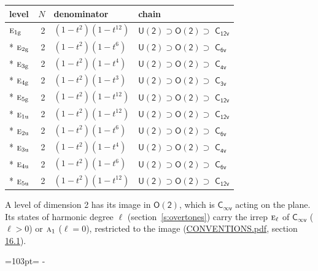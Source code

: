 \documentclass[10pt,a4paper]{article}
\newcommand{\needspace}[1]{\par\penalty-100\begingroup\dimen0=#1\relax\dimen2=\pagegoal
  \advance\dimen2-\pagetotal\ifdim\dimen0>\dimen2\relax\ifdim\dimen2>0pt\vfil\break\fi\fi
  \endgroup}
\numberwithin{equation}{section}
\newcommand{\grp}[1]{\mathsf{#1}}
\newcommand{\irr}[1]{\text{\normalfont\scshape #1}}
\newcommand{\ptag}[1]{\mathrm{#1}}
\begin{document}
{\small\begin{longtable}{@{}lrll@{}}\toprule
level & $N$ & denominator & chain\\\midrule\endhead
\bottomrule\endfoot\endlastfoot
$\irr{e}_{1\ptag{g}}$ & 2 & $(1-t^{2})(1-t^{12})$ & $\grp{U(2)} \supset \grp{O(2)} \supset$ \href{C12v.pdf}{$\grp{C_{12v}}$}\\*
$\irr{e}_{2\ptag{g}}$ & 2 & $(1-t^{2})(1-t^{6})$ & $\grp{U(2)} \supset \grp{O(2)} \supset$ \href{C6v.pdf}{$\grp{C_{6v}}$}\\*
$\irr{e}_{3\ptag{g}}$ & 2 & $(1-t^{2})(1-t^{4})$ & $\grp{U(2)} \supset \grp{O(2)} \supset$ \href{C4v.pdf}{$\grp{C_{4v}}$}\\*
$\irr{e}_{4\ptag{g}}$ & 2 & $(1-t^{2})(1-t^{3})$ & $\grp{U(2)} \supset \grp{O(2)} \supset$ \href{C3v.pdf}{$\grp{C_{3v}}$}\\*
$\irr{e}_{5\ptag{g}}$ & 2 & $(1-t^{2})(1-t^{12})$ & $\grp{U(2)} \supset \grp{O(2)} \supset$ \href{C12v.pdf}{$\grp{C_{12v}}$}\\*
$\irr{e}_{1\ptag{u}}$ & 2 & $(1-t^{2})(1-t^{12})$ & $\grp{U(2)} \supset \grp{O(2)} \supset$ \href{C12v.pdf}{$\grp{C_{12v}}$}\\*
$\irr{e}_{2\ptag{u}}$ & 2 & $(1-t^{2})(1-t^{6})$ & $\grp{U(2)} \supset \grp{O(2)} \supset$ \href{C6v.pdf}{$\grp{C_{6v}}$}\\*
$\irr{e}_{3\ptag{u}}$ & 2 & $(1-t^{2})(1-t^{4})$ & $\grp{U(2)} \supset \grp{O(2)} \supset$ \href{C4v.pdf}{$\grp{C_{4v}}$}\\*
$\irr{e}_{4\ptag{u}}$ & 2 & $(1-t^{2})(1-t^{6})$ & $\grp{U(2)} \supset \grp{O(2)} \supset$ \href{C6v.pdf}{$\grp{C_{6v}}$}\\*
$\irr{e}_{5\ptag{u}}$ & 2 & $(1-t^{2})(1-t^{12})$ & $\grp{U(2)} \supset \grp{O(2)} \supset$ \href{C12v.pdf}{$\grp{C_{12v}}$}\\
\bottomrule\end{longtable}}
A level of dimension 2 has its image in $\grp{O(2)}$, which is \href{Cinfv.pdf}{$\grp{C_{\infty v}}$} acting on the plane. \label{n:index.harmonic.degree}Its states of harmonic degree $\ell$ (section~\ref{s:overtones}) carry the irrep $\irr{e}_{\ell}$ of \href{Cinfv.pdf}{$\grp{C_{\infty v}}$} ($\ell > 0$) or $\irr{a}_{1}$ ($\ell = 0$), restricted to the image (\href{../../CONVENTIONS.pdf}{CONVENTIONS.pdf}, section \href{../../CONVENTIONS.pdf\#conv.16.1}{16.1}).
\needspace{103pt}
\end{document}
